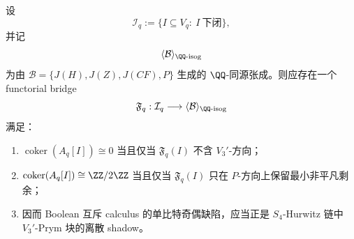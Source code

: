 \begin{conjecture}\label{conj:conclusion-s4-boolean-prym-dyadic-bridge}
设
\[
\mathcal I_q:=\{I\subseteq V_q:\ I\ \text{下闭}\},
\]
并记
\[
\langle \mathcal B\rangle_{\QQ\text{-isog}}
\]
为由 \(\mathcal B=\{J(H),J(Z),J(CF),P\}\) 生成的 \(\QQ\)-同源张成。则应存在一个 functorial bridge
\[
\mathfrak F_q:\mathcal I_q\longrightarrow \langle \mathcal B\rangle_{\QQ\text{-isog}}
\]
满足：
\begin{enumerate}
  \item \(\operatorname{coker}(A_q[I])\cong 0\) 当且仅当 \(\mathfrak F_q(I)\) 不含 \(V_3'\)-方向；
  \item \(\operatorname{coker}(A_q[I])\cong \ZZ/2\ZZ\) 当且仅当 \(\mathfrak F_q(I)\) 只在 \(P\)-方向上保留最小非平凡剩余；
  \item 因而 Boolean 互斥 calculus 的单比特奇偶缺陷，应当正是 \(S_4\)-Hurwitz 链中 \(V_3'\)-Prym 块的离散 shadow。
\end{enumerate}
\end{conjecture}

\endinput

